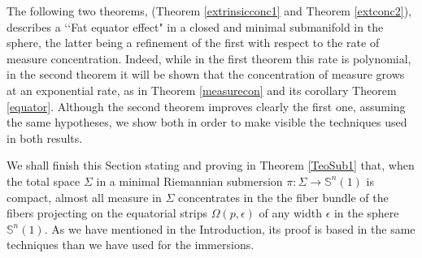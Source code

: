 \documentclass{amsart}
\theoremstyle{definition}
\theoremstyle{remark}
\newcommand{\ese}{\mathbb{S}}
\begin{document}
The following two  theorems, (Theorem \ref{extrinsicconc1} and Theorem \ref{extconc2}), describes a \lq\lq Fat equator effect" in a closed and minimal submanifold in the sphere, the latter being a refinement of the first with respect to the rate of measure concentration. Indeed, while in the first theorem this rate is polynomial, in the second theorem it will be shown that the concentration of measure grows at an exponential rate, as in Theorem \ref{measurecon} and its corollary  Theorem \ref{equator}. Although the second theorem improves clearly the first one, assuming the same hypotheses, we show both in order to make visible the techniques used in both results.

We shall finish this Section stating and proving in Theorem \ref{TeoSub1}  that, when the total space $\Sigma$ in a minimal Riemannian submersion $\pi: \Sigma \rightarrow \ese^n(1)$ is compact, almost all measure in $\Sigma$ concentrates in the the fiber bundle of the fibers projecting on the equatorial strips $\Omega(p, \epsilon)$ of any width $\epsilon$ in the sphere $\ese^n(1)$. As we have mentioned in the Introduction, its proof is based in the same techniques than we have used for the immersions.
\end{document}
